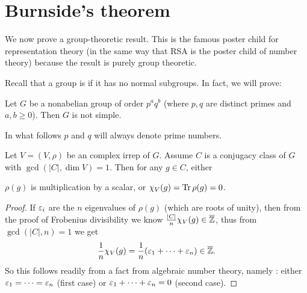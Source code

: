 \section{Burnside's theorem}
We now prove a group-theoretic result.
This is the famous poster child for representation theory
(in the same way that RSA is the poster child of number theory)
because the result is purely group theoretic.

Recall that a group is  if it has no normal subgroups.
In fact, we will prove:
\begin{theorem}[Burnside]
	Let $G$ be a nonabelian group of order $p^a q^b$ (where $p,q$ are distinct primes and $a,b \ge 0$).
	Then $G$ is not simple.
\end{theorem}
In what follows $p$ and $q$ will always denote prime numbers.

\begin{lemma}[On $\gcd(|C|, \dim V) = 1$]
	\label{lem:burnside_ant_lemma}
	Let $V = (V, \rho)$ be an complex irrep of $G$.
	Assume $C$ is a conjugacy class of $G$ with $\gcd(|C|, \dim V) = 1$.
	Then for any $g \in C$, either
	\begin{itemize}
		\ii $\rho(g)$ is multiplication by a scalar, or
		\ii $\chi_V(g) = \operatorname{Tr} \rho(g) = 0$.
	\end{itemize}
\end{lemma}
\begin{proof}
	If $\varepsilon_i$ are the $n$ eigenvalues of $\rho(g)$ (which are roots of unity),
	then from the proof of Frobenius divisibility we know
	$\frac{|C|}{n} \chi_V(g) \in \overline{\mathbb Z}$,
	thus from $\gcd(|C|, n) = 1$ we get
	\[ \frac1n \chi_V(g) = \frac1n(\varepsilon_1 + \dots + \varepsilon_n) \in \overline{\mathbb Z}. \]
	So this follows readily from a fact from algebraic number theory,
	namely :
	either $\varepsilon_1 = \dots = \varepsilon_n$ (first case) or
	$\varepsilon_1 + \dots + \varepsilon_n = 0$ (second case).
\end{proof}

